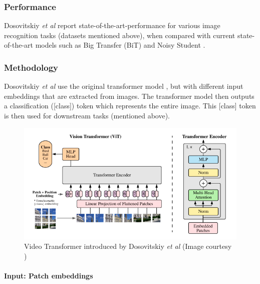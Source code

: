 \subsubsection{Performance}
\par Dosovitskiy \textit{et al} report state-of-the-art-performance for various image recognition tasks (datasets mentioned above), when compared with current state-of-the-art models such as Big Transfer (BiT) \cite{bit} and Noisy Student \cite{nos}.\par


\subsubsection{Methodology}

\par Dosovitskiy \textit{et al} use the original transformer model \cite{tfm}, but with different input embeddings that are extracted from images. The transformer model then outputs a classification ([class]) token which represents the entire image. This [class] token is then used for downstream tasks (mentioned above).\par

\begin{figure}[h]
	\includegraphics[width=\linewidth]{assets/img/vit.png}
	\caption{Video Transformer introduced by Dosovitskiy \textit{et al} (Image courtesy \cite{vit})}
\end{figure}


\paragraph{Input: Patch embeddings}

